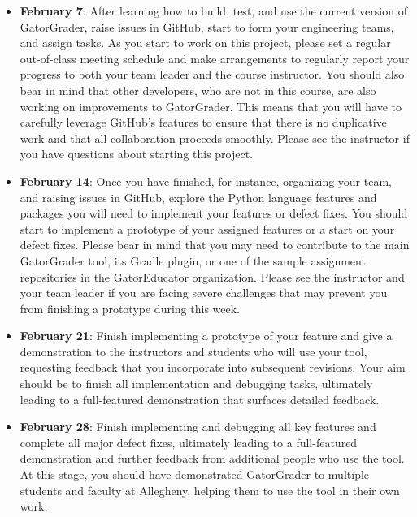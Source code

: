 \documentclass[11pt]{article}
\begin{document}
\begin{itemize}

  \setlength{\itemsep}{0pt}

  \item {\bf February 7}: After learning how to build, test, and use the current
    version of GatorGrader, raise issues in GitHub, start to form your
    engineering teams, and assign tasks. As you start to work on this project,
    please set a regular out-of-class meeting schedule and make arrangements to
    regularly report your progress to both your team leader and the course
    instructor. You should also bear in mind that other developers, who are not
    in this course, are also working on improvements to GatorGrader. This means
    that you will have to carefully leverage GitHub's features to ensure that
    there is no duplicative work and that all collaboration proceeds smoothly.
    Please see the instructor if you have questions about starting this project.

  \item {\bf February 14}: Once you have finished, for instance, organizing your
    team, and raising issues in GitHub, explore the Python language features and
    packages you will need to implement your features or defect fixes. You
    should start to implement a prototype of your assigned features or a start
    on your defect fixes. Please bear in mind that you may need to contribute to
    the main GatorGrader tool, its Gradle plugin, or one of the sample
    assignment repositories in the GatorEducator organization. Please see the
    instructor and your team leader if you are facing severe challenges that may
    prevent you from finishing a prototype during this week.

  \item {\bf February 21}: Finish implementing a prototype of your feature and
    give a demonstration to the instructors and students who will use your tool,
    requesting feedback that you incorporate into subsequent revisions. Your aim
    should be to finish all implementation and debugging tasks, ultimately
    leading to a full-featured demonstration that surfaces detailed feedback.

  \item {\bf February 28}: Finish implementing and debugging all key features
    and complete all major defect fixes, ultimately leading to a full-featured
    demonstration and further feedback from additional people who use the tool.
    At this stage, you should have demonstrated GatorGrader to multiple students
    and faculty at Allegheny, helping them to use the tool in their own work.


\end{itemize}
\end{document}
